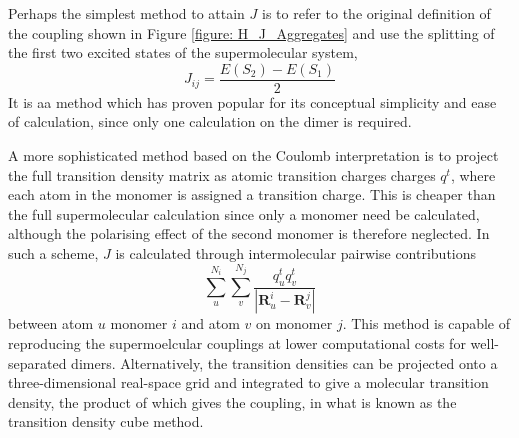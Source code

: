 Perhaps the simplest method to attain $J$ is to refer to the original definition of the coupling shown in Figure \ref{figure: H_J_Aggregates} and use the splitting of the first two excited states of the supermolecular system,
\begin{equation}
    J_{ij}=\frac{E(S_{2})-E(S_{1})}{2}
\end{equation}
It is aa method which has proven popular for its conceptual simplicity and ease of calculation, since only one calculation on the dimer is required.\cite{Hsu2009,Gierschner2013a,Shi2017}

A more sophisticated method based on the Coulomb interpretation is to project the full transition density matrix as atomic transition charges charges $q^{t}$, where each atom in the monomer is assigned a transition charge. This is cheaper than the full supermolecular calculation since only a monomer need be calculated, although the polarising effect of the second monomer is therefore neglected. In such a scheme, $J$ is calculated through intermolecular pairwise contributions
\begin{equation}\label{equation: J_TC}
\sum_{u}^{N_{i}}\sum_{v}^{N_{j}}\frac{q^{t}_{u}q^{t}_{v}}{|\bm{R}_{u}^{i}-\bm{R}_{v}^{j}|}
\end{equation}
between atom $u$ monomer $i$ and atom $v$ on monomer $j$. This method is capable of reproducing the supermoelcular couplings at lower computational costs for well-separated dimers.\cite{Kistler2013} Alternatively, the transition densities can be projected onto a three-dimensional real-space grid and integrated to give a molecular transition density, the product of which gives the coupling, in what is known as the transition density cube method.\cite{Bricker2014}

